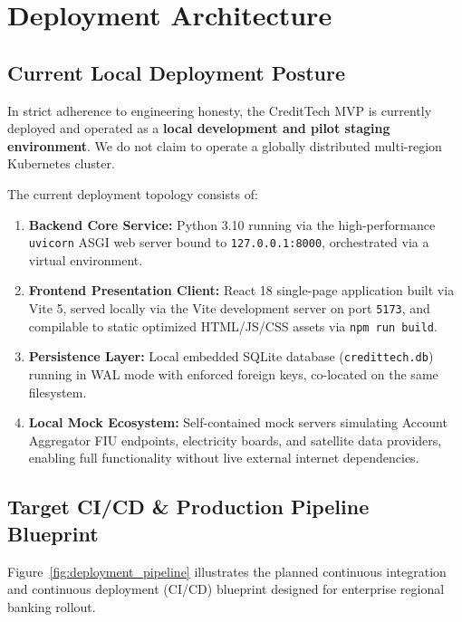 \chapter{Deployment Architecture}
\label{chap:deployment_architecture}

\section{Current Local Deployment Posture}
In strict adherence to engineering honesty, the CreditTech MVP is currently deployed and operated as a \textbf{local development and pilot staging environment}. We do not claim to operate a globally distributed multi-region Kubernetes cluster. 

The current deployment topology consists of:
\begin{enumerate}
  \item \textbf{Backend Core Service:} Python 3.10 running via the high-performance \texttt{uvicorn} ASGI web server bound to \texttt{127.0.0.1:8000}, orchestrated via a virtual environment.
  \item \textbf{Frontend Presentation Client:} React 18 single-page application built via Vite 5, served locally via the Vite development server on port \texttt{5173}, and compilable to static optimized HTML/JS/CSS assets via \texttt{npm run build}.
  \item \textbf{Persistence Layer:} Local embedded SQLite database (\texttt{credittech.db}) running in WAL mode with enforced foreign keys, co-located on the same filesystem.
  \item \textbf{Local Mock Ecosystem:} Self-contained mock servers simulating Account Aggregator FIU endpoints, electricity boards, and satellite data providers, enabling full functionality without live external internet dependencies.
\end{enumerate}

\section{Target CI/CD \& Production Pipeline Blueprint}
Figure~\ref{fig:deployment_pipeline} illustrates the planned continuous integration and continuous deployment (CI/CD) blueprint designed for enterprise regional banking rollout.

